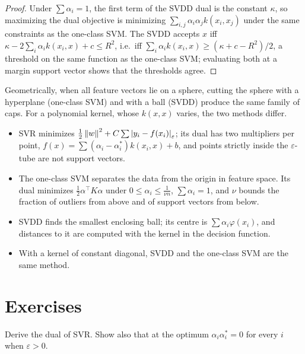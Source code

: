 \begin{notechapter}
\begin{proof}
Under $\sum\alpha_i = 1$, the first term of the SVDD dual is the constant $\kappa$, so maximizing the
dual objective is minimizing $\sum_{i,j}\alpha_i\alpha_jk(x_i, x_j)$ under the same constraints as the one-class SVM. The SVDD
accepts $x$ iff $\kappa - 2\sum_i\alpha_ik(x_i, x) + c\leq R^2$, i.e.\ iff $\sum_i\alpha_ik(x_i, x)\geq(\kappa + c - R^2)/2$, a threshold
on the same function as the one-class SVM; evaluating both at a margin support vector
shows that the thresholds agree.
\end{proof}

Geometrically, when all feature vectors lie on a sphere, cutting the sphere with a
hyperplane (one-class SVM) and with a ball (SVDD) produce the same family of caps. For a
polynomial kernel, whose $k(x, x)$ varies, the two methods differ.

\begin{chaptersummary}
\begin{itemize}[nosep]
  \item SVR minimizes $\frac12\left\|w\right\|^2 + C\sum\left|y_i - f(x_i)\right|_\varepsilon$; its dual has two multipliers per point,
        $f(x) = \sum(\alpha_i - \alpha_i^*)k(x_i, x) + b$, and points strictly inside the $\varepsilon$-tube are not support vectors.
  \item The one-class SVM separates the data from the origin in feature space. Its dual
        minimizes $\frac12\alpha^\top K\alpha$ under $0\leq\alpha_i\leq\frac1{\nu n}$, $\sum\alpha_i = 1$, and $\nu$ bounds the fraction of outliers
        from above and of support vectors from below.
  \item SVDD finds the smallest enclosing ball; its centre is $\sum\alpha_i\varphi(x_i)$, and distances to it are
        computed with the kernel in the decision function.
  \item With a kernel of constant diagonal, SVDD and the one-class SVM are the same method.
\end{itemize}
\end{chaptersummary}

\section*{Exercises}

\begin{exercise}\label{support-vector-methods:exr:1}
Derive the dual of SVR. Show also that at the optimum $\alpha_i\alpha_i^* = 0$ for every $i$ when $\varepsilon>0$.
\end{exercise}


\end{notechapter}
